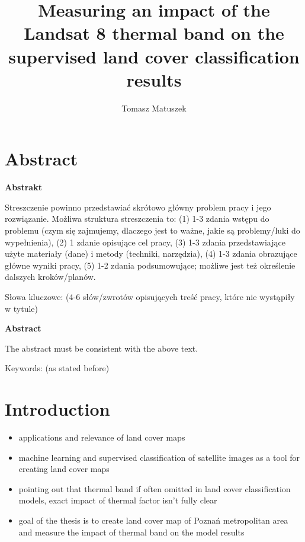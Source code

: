 \documentclass{amuthesis}
\author{Tomasz Matuszek}
\title{Measuring an impact of the Landsat 8 thermal band on the
supervised land cover classification results}
\begin{document}

\titlepage


\hypertarget{abstract}{%
\chapter*{Abstract}\label{abstract}}


\textbf{Abstrakt}

Streszczenie powinno przedstawiać skrótowo główny problem pracy i jego
rozwiązanie. Możliwa struktura streszczenia to: (1) 1-3 zdania wstępu do
problemu (czym się zajmujemy, dlaczego jest to ważne, jakie są
problemy/luki do wypełnienia), (2) 1 zdanie opisujące cel pracy, (3) 1-3
zdania przedstawiające użyte materiały (dane) i metody (techniki,
narzędzia), (4) 1-3 zdania obrazujące główne wyniki pracy, (5) 1-2
zdania podsumowujące; możliwe jest też określenie dalszych
kroków/planów.

Słowa kluczowe: (4-6 słów/zwrotów opisujących treść pracy, które nie
wystąpiły w tytule)

\textbf{Abstract}

The abstract must be consistent with the above text.

Keywords: (as stated before)

\newpage

\sf\tighttoc\doublespacing


\hypertarget{sec-intro}{%
\chapter{Introduction}\label{sec-intro}}

\begin{itemize}
\item
  applications and relevance of land cover maps
\item
  machine learning and supervised classification of satellite images as
  a tool for creating land cover maps
\item
  pointing out that thermal band if often omitted in land cover
  classification models, exact impact of thermal factor isn't fully
  clear
\item
  goal of the thesis is to create land cover map of Poznań metropolitan
  area and measure the impact of thermal band on the model results
\end{itemize}
\end{document}
